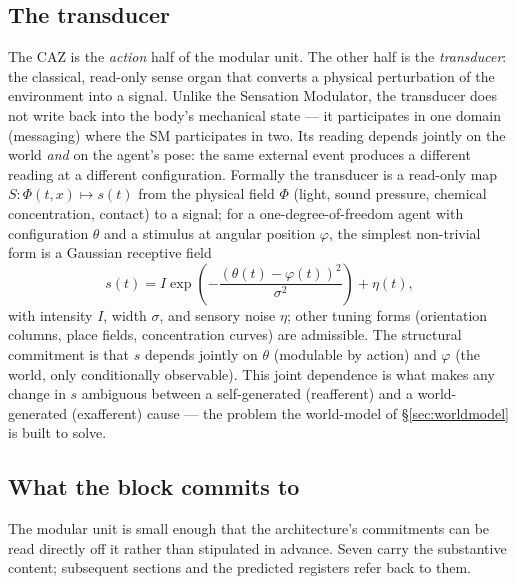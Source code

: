 \documentclass{article}
\begin{document}
\subsection{The transducer}\label{sec:atom-transducer}

The CAZ is the \emph{action} half of the modular unit.  The other half is the
\emph{transducer}: the classical, read-only sense organ that converts a
physical perturbation of the environment into a signal.  Unlike the
Sensation Modulator, the transducer does not write back into the body's
mechanical state --- it participates in one domain (messaging) where
the SM participates in two.  Its reading depends jointly on the world
\emph{and} on the agent's pose: the same external event produces a
different reading at a different configuration.  Formally the
transducer is a read-only map $S:\Phi(t,x)\mapsto s(t)$ from the
physical field $\Phi$ (light, sound pressure, chemical concentration,
contact) to a signal; for a one-degree-of-freedom agent with
configuration $\theta$ and a stimulus at angular position $\varphi$,
the simplest non-trivial form is a Gaussian receptive field
\begin{equation}
s(t) = I\exp\!\left(-\frac{(\theta(t)-\varphi(t))^2}{\sigma^2}\right) + \eta(t),
\label{eq:rf}
\end{equation}
with intensity $I$, width $\sigma$, and sensory noise $\eta$; other
tuning forms (orientation columns, place fields, concentration curves)
are admissible.  The structural commitment is that $s$ depends jointly
on $\theta$ (modulable by action) and $\varphi$ (the world, only
conditionally observable).  This joint dependence is what makes any
change in $s$ ambiguous between a self-generated (reafferent) and a
world-generated (exafferent) cause --- the problem the world-model of
\S\ref{sec:worldmodel} is built to solve.

\subsection{What the block commits to}\label{sec:atom-commitments}

The modular unit is small enough that the architecture's commitments can be
read directly off it rather than stipulated in advance.  Seven carry the
substantive content; subsequent sections and the predicted registers
refer back to them.
\end{document}
